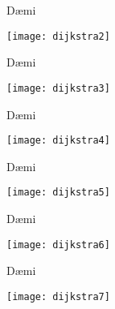 \documentclass[handout]{beamer}
\begin{document}
\begin{frame}{Dæmi}
    \begin{center}
        \texttt{[image: dijkstra2]}
    \end{center}
\end{frame}

\begin{frame}{Dæmi}
    \begin{center}
        \texttt{[image: dijkstra3]}
    \end{center}
\end{frame}

\begin{frame}{Dæmi}
    \begin{center}
        \texttt{[image: dijkstra4]}
    \end{center}
\end{frame}

\begin{frame}{Dæmi}
    \begin{center}
        \texttt{[image: dijkstra5]}
    \end{center}
\end{frame}

\begin{frame}{Dæmi}
    \begin{center}
        \texttt{[image: dijkstra6]}
    \end{center}
\end{frame}

\begin{frame}{Dæmi}
    \begin{center}
        \texttt{[image: dijkstra7]}
    \end{center}
\end{frame}
\end{document}
